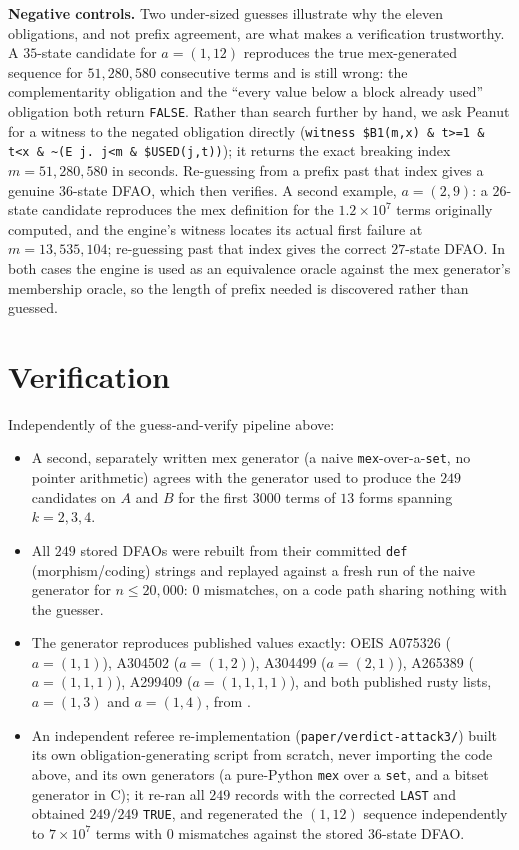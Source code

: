 \documentclass[10pt,reqno]{amsart}
\theoremstyle{plain}
\theoremstyle{definition}
\theoremstyle{remark}
\numberwithin{theorem}{section}
\begin{document}
\textbf{Negative controls.} Two under-sized guesses illustrate why the eleven obligations, and
not prefix agreement, are what makes a verification trustworthy. A $35$-state candidate for
$a=(1,12)$ reproduces the true mex-generated sequence for $51{,}280{,}580$ consecutive terms and
is still wrong: the complementarity obligation and the ``every value below a block already
used'' obligation both return \texttt{FALSE}. Rather than search further by hand, we ask Peanut for a witness to
the negated obligation directly (\texttt{witness \$B1(m,x) \& t>=1 \& t<x \& \~{}(E j. j<m \&
\$USED(j,t))}); it returns the exact breaking index $m=51{,}280{,}580$ in seconds. Re-guessing
from a prefix past that index gives a genuine $36$-state DFAO, which then verifies. A second
example, $a=(2,9)$: a $26$-state candidate reproduces the mex definition for the
$1.2\times10^7$ terms originally computed, and the engine's witness locates its actual first
failure at $m=13{,}535{,}104$; re-guessing past that index gives the correct $27$-state DFAO.
In both cases the engine is used as an equivalence oracle against the mex generator's membership
oracle, so the length of prefix needed is discovered rather than guessed.

\section{Verification}
\label{sec:verif}

Independently of the guess-and-verify pipeline above:

\begin{itemize}
\item A second, separately written mex generator (a naive \texttt{mex}-over-a-\texttt{set},
no pointer arithmetic) agrees with the generator used to produce the $249$ candidates on $A$
and $B$ for the first $3000$ terms of $13$ forms spanning $k=2,3,4$.
\item All $249$ stored DFAOs were rebuilt from their committed \texttt{def} (morphism/coding)
strings and replayed against a fresh run of the naive generator for $n\le20{,}000$: $0$
mismatches, on a code path sharing nothing with the guesser.
\item The generator reproduces published values exactly: OEIS A075326 ($a=(1,1)$), A304502
($a=(1,2)$), A304499 ($a=(2,1)$), A265389 ($a=(1,1,1)$), A299409 ($a=(1,1,1,1)$), and both
published rusty lists, $a=(1,3)$ and $a=(1,4)$, from \cite[\S5]{FJ}.
\item An independent referee re-implementation (\texttt{paper/verdict-attack3/}) built its own
obligation-generating script from scratch, never importing the code above, and its own
generators (a pure-Python \texttt{mex} over a \texttt{set}, and a bitset generator in C); it
re-ran all $249$ records with the corrected \texttt{LAST} and obtained $249/249$
\texttt{TRUE}, and regenerated the $(1,12)$ sequence independently to $7\times10^7$ terms with
$0$ mismatches against the stored $36$-state DFAO.
\end{itemize}
\end{document}
